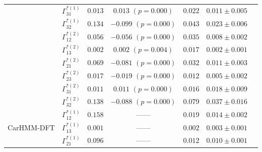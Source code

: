 \documentclass{article}
\begin{document}
\begin{center}
{\begin{tabular}{ccccccc}
                             & $\Gamma^{*(1)}_{31}$          & $0.013$                         & $0.013$ $(p=0.000)$        & $0.022$                           & $0.011 \pm 0.005$                             \\
                             & $\Gamma^{*(1)}_{32}$          & $0.134$                         & $-0.099$ $(p=0.000)$        & $0.043$                           & $0.023 \pm 0.006$                             \\
                             & $\Gamma^{*(2)}_{12}$          & $0.056$                         & $-0.056$ $(p=0.000)$        & $0.035$                           & $0.008 \pm 0.002$                             \\
                             & $\Gamma^{*(2)}_{13}$          & $0.002$                         & $0.002$ $(p=0.004)$        & $0.017$                           & $0.002 \pm 0.001$                             \\
                             & $\Gamma^{*(2)}_{21}$          & $0.069$                         & $-0.081$ $(p=0.000)$        & $0.032$                           & $0.011 \pm 0.003$                             \\
                             & $\Gamma^{*(2)}_{23}$          & $0.017$                         & $-0.019$ $(p=0.000)$        & $0.012$                           & $0.005 \pm 0.002$                             \\
                             & $\Gamma^{*(2)}_{31}$          & $0.011$                         & $0.011$ $(p=0.000)$        & $0.016$                           & $0.018 \pm 0.009$                             \\
                             & $\Gamma^{*(2)}_{32}$          & $0.138$                         & $-0.088$ $(p=0.000)$        & $0.079$                           & $0.037 \pm 0.016$                             \\ \hline
\multirow{6}{*}{CarHMM-DFT}  & $\Gamma^{*(1)}_{12}$          & $0.158$                         & ------                   & $0.019$                           & $0.014 \pm 0.002$                             \\
                             & $\Gamma^{*(1)}_{13}$          & $0.001$                         & ------                   & $0.002$                           & $0.003 \pm 0.001$                             \\
                             & $\Gamma^{*(1)}_{21}$          & $0.096$                         & ------                   & $0.012$                           & $0.010 \pm 0.001$                             \\

\end{tabular}}
\end{center}
\end{document}
